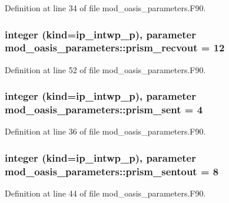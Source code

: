 Definition at line 34 of file mod\+\_\+oasis\+\_\+parameters.\+F90.

\hypertarget{classmod__oasis__parameters_ab56f2573ea7fd626f24e42606f4745a2}{
\subsubsection[{prism\+\_\+recvout}]{\setlength{\rightskip}{0pt plus 5cm}integer (kind=ip\+\_\+intwp\+\_\+p), parameter mod\+\_\+oasis\+\_\+parameters\+::prism\+\_\+recvout = 12}}\label{classmod__oasis__parameters_ab56f2573ea7fd626f24e42606f4745a2}


Definition at line 52 of file mod\+\_\+oasis\+\_\+parameters.\+F90.

\hypertarget{classmod__oasis__parameters_a403c181a893e178ee0ad6ec6f8d26c9c}{
\subsubsection[{prism\+\_\+sent}]{\setlength{\rightskip}{0pt plus 5cm}integer (kind=ip\+\_\+intwp\+\_\+p), parameter mod\+\_\+oasis\+\_\+parameters\+::prism\+\_\+sent = 4}}\label{classmod__oasis__parameters_a403c181a893e178ee0ad6ec6f8d26c9c}


Definition at line 36 of file mod\+\_\+oasis\+\_\+parameters.\+F90.

\hypertarget{classmod__oasis__parameters_a9f683811203a8cf60704b4938a8f3a11}{
\subsubsection[{prism\+\_\+sentout}]{\setlength{\rightskip}{0pt plus 5cm}integer (kind=ip\+\_\+intwp\+\_\+p), parameter mod\+\_\+oasis\+\_\+parameters\+::prism\+\_\+sentout = 8}}\label{classmod__oasis__parameters_a9f683811203a8cf60704b4938a8f3a11}


Definition at line 44 of file mod\+\_\+oasis\+\_\+parameters.\+F90.

